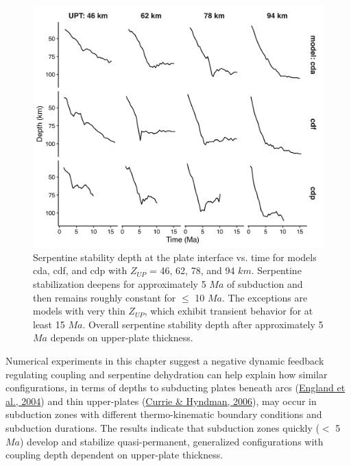 \begin{figure}[htbp]

{\centering \includegraphics[width=1\linewidth,]{assets/figs/chpt2/figA1} 

}

\caption[Serpentine stability depth vs. time]{Serpentine stability depth at the plate interface vs. time for models cda, cdf, and cdp with $Z_{UP}$ = 46, 62, 78, and 94 $km$. Serpentine stabilization deepens for approximately 5 $Ma$ of subduction and then remains roughly constant for $\leq$ 10 $Ma$. The exceptions are models with very thin $Z_{UP}$, which exhibit transient behavior for at least 15 $Ma$. Overall serpentine stability depth after approximately 5 $Ma$ depends on upper-plate thickness.}\label{fig:antDepth}
\end{figure}

Numerical experiments in this chapter suggest a negative dynamic feedback regulating coupling and serpentine dehydration can help explain how similar configurations, in terms of depths to subducting plates beneath arcs (\protect\hyperlink{ref-england2004}{England et al., 2004}) and thin upper-plates (\protect\hyperlink{ref-currie2006}{Currie \& Hyndman, 2006}), may occur in subduction zones with different thermo-kinematic boundary conditions and subduction durations. The results indicate that subduction zones quickly (\(<\) 5 \(Ma\)) develop and stabilize quasi-permanent, generalized configurations with coupling depth dependent on upper-plate thickness.

